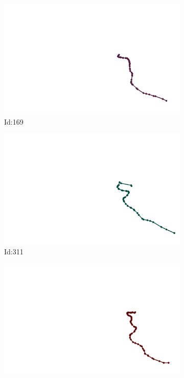 \documentclass[12pt,twoside]{report}
\begin{document}
\begin{figure}
\centering
\begin{subfigure}[b]{0.20\textwidth}
\centering
\includegraphics[width=\textwidth]{../../trajectories/169.png}
\caption{Id:169}
\end{subfigure}
\begin{subfigure}[b]{0.20\textwidth}
\centering
\includegraphics[width=\textwidth]{../../trajectories/311.png}
\caption{Id:311}
\end{subfigure}
\begin{subfigure}[b]{0.20\textwidth}
\centering
\includegraphics[width=\textwidth]{../../trajectories/603.png}

\end{subfigure}
\end{figure}
\end{document}
